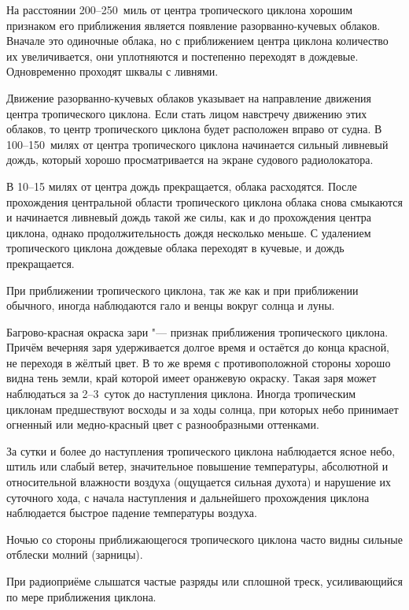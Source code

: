 На расстоянии 200--250~миль от центра тропического циклона хорошим
признаком его приближения является появление разорванно-кучевых
облаков. Вначале это одиночные облака, но с приближением центра
циклона количество их увеличивается, они уплотняются и постепенно
переходят в дождевые. Одновременно проходят шквалы с ливнями.

Движение разорванно-кучевых облаков указывает на направление движения
центра тропического циклона. Если стать лицом навстречу движению этих
облаков, то центр тропического циклона будет расположен вправо от
судна. В 100--150~милях от центра тропического циклона начинается
сильный ливневый дождь, который хорошо просматривается на экране
судового радиолокатора.

В 10--15 милях от центра дождь прекращается, облака расходятся. После
прохождения центральной области тропического циклона облака снова
смыкаются и начинается ливневый дождь такой же силы, как и до
прохождения центра циклона, однако продолжительность дождя несколько
меньше. С удалением тропического циклона дождевые облака переходят в
кучевые, и дождь прекращается.

 При приближении тропического циклона, так же как и при
приближении обычного, иногда наблюдаются гало и венцы вокруг солнца и
луны.

 Багрово-красная окраска зари "--- признак приближения тропического
циклона. Причём вечерняя заря удерживается долгое время и остаётся до
конца красной, не переходя в жёлтый цвет. В то же время с
противоположной стороны хорошо видна тень земли, край которой имеет
оранжевую окраску. Такая заря может наблюдаться за 2--3~суток до
наступления циклона. Иногда тропическим циклонам предшествуют восходы
и за ходы солнца, при которых небо принимает огненный или
медно-красный цвет с разнообразными оттенками.

 За сутки и более до наступления тропического циклона
наблюдается ясное небо, штиль или слабый ветер, значительное повышение
температуры, абсолютной и относительной влажности воздуха (ощущается
сильная духота) и нарушение их суточного хода, с начала наступления и
дальнейшего прохождения циклона наблюдается быстрое падение
температуры воздуха.

 Ночью со стороны приближающегося тропического циклона часто видны
сильные отблески молний (зарницы).

 При радиоприёме слышатся частые разряды или сплошной треск,
усиливающийся по мере приближения циклона.

